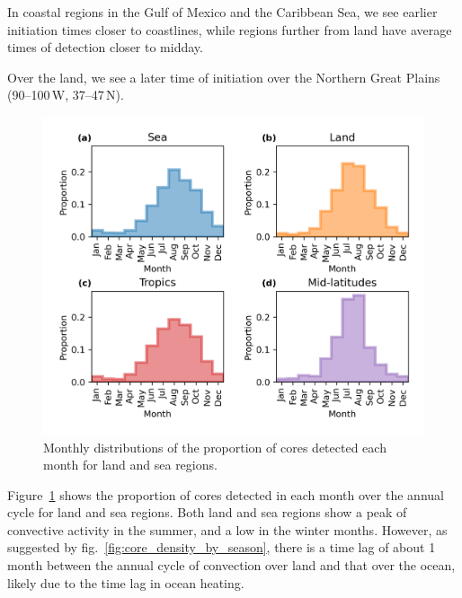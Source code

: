 In coastal regions in the Gulf of Mexico and the Caribbean Sea, we see earlier initiation times closer to coastlines, while regions further from land have average times of detection closer to midday.


Over the land, we see a later time of initiation over the Northern Great Plains (90--100\,\textdegree W, 37--47\,\textdegree N).


\begin{figure}[tp]
    \centering
    \includegraphics[width=\textwidth]{figures/chapter2_04.png}
    \caption[
    Monthly distributions of the proportion of cores detected each month for land and sea regions
    ]{
    Monthly distributions of the proportion of cores detected each month for land and sea regions.
    }
    \label{fig:core_annual_land_sea}
\end{figure}

Figure~\ref{fig:core_annual_land_sea} shows the proportion of cores detected in each month over the annual cycle for land and sea regions.
Both land and sea regions show a peak of convective activity in the summer, and a low in the winter months.
However, as suggested by fig.~\ref{fig:core_density_by_season}, there is a time lag of about 1 month between the annual cycle of convection over land and that over the ocean, likely due to the time lag in ocean heating.

